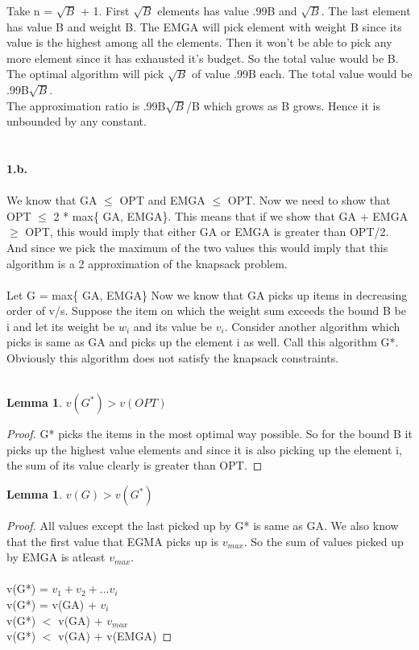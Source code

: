 \documentclass[11pt]{article}
\newtheorem{lemma}[theorem]{Lemma}
\begin{document}
Take n = $\sqrt{B}$ + 1. First $\sqrt{B}$ elements has value .99B and $\sqrt{B}$. The last element has value B and weight B. The EMGA will pick element with weight B since its value is the highest among all the elements. Then it won't be able to pick any more element since it has exhausted it's budget. So the total value would be B. The optimal algorithm will pick $\sqrt{B}$ of value .99B each. The total value would be .99B$\sqrt{B}$.\\
The approximation ratio is .99B$\sqrt{B}$/B which grows as B grows. Hence it is unbounded by any constant.
\\\\\\
{\bf 1.b.} \\\\We know that GA $\leq$ OPT and EMGA $\leq$ OPT. Now we need to show that OPT $\leq$ 2 * max\{ GA, EMGA\}. This means that if we show that GA + EMGA $\geq$ OPT, this would imply that either GA or EMGA is greater than OPT/2. And since we pick the maximum of the two values this would imply that this algorithm is a 2 approximation of the knapsack problem.\\\\
Let G = max\{ GA, EMGA\}
Now we know that GA picks up items in decreasing order of v/s. Suppose the item on which the weight sum exceeds the bound B be i and let its weight be 
$w_i$ and its value be $v_i$. Consider another algorithm which picks is same as GA and picks up the element i as well. Call this algorithm G*. Obviously this algorithm does not satisfy the knapsack constraints. \\\\
\begin{lemma}
$v(G^*) > v(OPT)$
\end{lemma}
\begin{proof}
G* picks the items in the most optimal way possible. So for the bound B it picks up the highest value elements and since it is also picking up the element i, the sum of its value clearly is greater than OPT.
\end{proof}

\begin{lemma}
$v(G) >  v(G^*)$
\end{lemma}
\begin{proof}
All values except the last picked up by G* is same as GA. We also know that the first value that EGMA picks up is $v_{max}$. So the sum of values picked up by EMGA is atleast $v_{max}$.\\\\
v(G*) = $v_1 + v_2 + ... v_i$\\
v(G*) = v(GA) + $v_i$\\
v(G*) $<$ v(GA) + $v_{max}$\\
v(G*) $<$ v(GA) + v(EMGA)
\end{proof}
\end{document}
